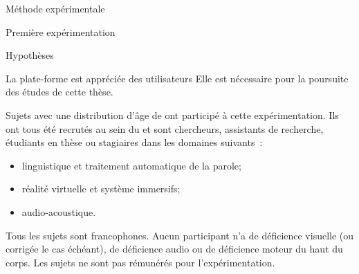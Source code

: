 \documentclass[myfrancais]{mythesis}
\begin{document}
\begin{mychapter}{Méthode expérimentale}
\begin{mysection}{Première expérimentation}
\begin{mysubsection}{Hypothèses}
\begin{myparagraph}{ La plate-forme est appréciée des utilisateurs}
					Elle est nécessaire pour la poursuite des études de cette thèse.
				\end{myparagraph}
			\end{mysubsection}
			\begin{mysubsection}{Sujets}
				 avec une distribution d'âge de  ont participé à cette expérimentation.
				Ils ont tous été recrutés au sein du  et sont chercheurs, assistants de recherche, étudiants en thèse ou stagiaires dans les domaines suivants~:
				\begin{itemize}
					\item linguistique et traitement automatique de la parole;
					\item réalité virtuelle et système immersifs;
					\item audio-acoustique.
				\end{itemize}

				Tous les sujets sont francophones.
				Aucun participant n'a de déficience visuelle (ou corrigée le cas échéant), de déficience audio ou de déficience moteur du haut du corps.
				Les sujets ne sont pas rémunérés pour l'expérimentation.


\end{mysubsection}
\end{mysection}
\end{mychapter}
\end{document}
